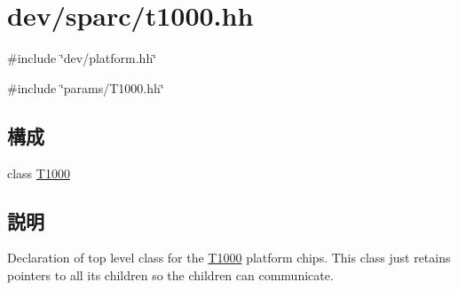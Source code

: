 \hypertarget{t1000_8hh}{
\section{dev/sparc/t1000.hh}
\label{t1000_8hh}
}
{\ttfamily \#include \char`\"{}dev/platform.hh\char`\"{}}\par
{\ttfamily \#include \char`\"{}params/T1000.hh\char`\"{}}\par
\subsection*{構成}
\begin{DoxyCompactItemize}
\item 
class \hyperlink{classT1000}{T1000}
\end{DoxyCompactItemize}


\subsection{説明}
Declaration of top level class for the \hyperlink{classT1000}{T1000} platform chips. This class just retains pointers to all its children so the children can communicate. 